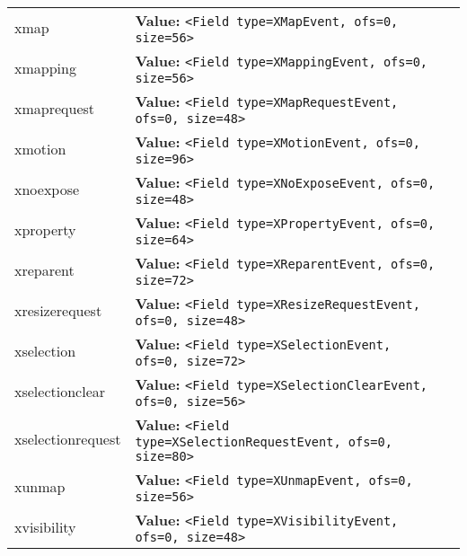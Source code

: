 \begin{longtable}{|p{\varnamewidth}|p{\vardescrwidth}|l}
\cline{1-2}
\raggedright x\-m\-a\-p\- & \raggedright \textbf{Value:} 
{\tt {\textless}Field type=XMapEvent, ofs=0, size=56{\textgreater}}&\\
\cline{1-2}
\raggedright x\-m\-a\-p\-p\-i\-n\-g\- & \raggedright \textbf{Value:} 
{\tt {\textless}Field type=XMappingEvent, ofs=0, size=56{\textgreater}}&\\
\cline{1-2}
\raggedright x\-m\-a\-p\-r\-e\-q\-u\-e\-s\-t\- & \raggedright \textbf{Value:} 
{\tt {\textless}Field type=XMapRequestEvent, ofs=0, size=48{\textgreater}}&\\
\cline{1-2}
\raggedright x\-m\-o\-t\-i\-o\-n\- & \raggedright \textbf{Value:} 
{\tt {\textless}Field type=XMotionEvent, ofs=0, size=96{\textgreater}}&\\
\cline{1-2}
\raggedright x\-n\-o\-e\-x\-p\-o\-s\-e\- & \raggedright \textbf{Value:} 
{\tt {\textless}Field type=XNoExposeEvent, ofs=0, size=48{\textgreater}}&\\
\cline{1-2}
\raggedright x\-p\-r\-o\-p\-e\-r\-t\-y\- & \raggedright \textbf{Value:} 
{\tt {\textless}Field type=XPropertyEvent, ofs=0, size=64{\textgreater}}&\\
\cline{1-2}
\raggedright x\-r\-e\-p\-a\-r\-e\-n\-t\- & \raggedright \textbf{Value:} 
{\tt {\textless}Field type=XReparentEvent, ofs=0, size=72{\textgreater}}&\\
\cline{1-2}
\raggedright x\-r\-e\-s\-i\-z\-e\-r\-e\-q\-u\-e\-s\-t\- & \raggedright \textbf{Value:} 
{\tt {\textless}Field type=XResizeRequestEvent, ofs=0, size=48{\textgreater}}&\\
\cline{1-2}
\raggedright x\-s\-e\-l\-e\-c\-t\-i\-o\-n\- & \raggedright \textbf{Value:} 
{\tt {\textless}Field type=XSelectionEvent, ofs=0, size=72{\textgreater}}&\\
\cline{1-2}
\raggedright x\-s\-e\-l\-e\-c\-t\-i\-o\-n\-c\-l\-e\-a\-r\- & \raggedright \textbf{Value:} 
{\tt {\textless}Field type=XSelectionClearEvent, ofs=0, size=56{\textgreater}}&\\
\cline{1-2}
\raggedright x\-s\-e\-l\-e\-c\-t\-i\-o\-n\-r\-e\-q\-u\-e\-s\-t\- & \raggedright \textbf{Value:} 
{\tt {\textless}Field type=XSelectionRequestEvent, ofs=0, size=80{\textgreater}}&\\
\cline{1-2}
\raggedright x\-u\-n\-m\-a\-p\- & \raggedright \textbf{Value:} 
{\tt {\textless}Field type=XUnmapEvent, ofs=0, size=56{\textgreater}}&\\
\cline{1-2}
\raggedright x\-v\-i\-s\-i\-b\-i\-l\-i\-t\-y\- & \raggedright \textbf{Value:} 
{\tt {\textless}Field type=XVisibilityEvent, ofs=0, size=48{\textgreater}}&\\
\cline{1-2}
\end{longtable}


